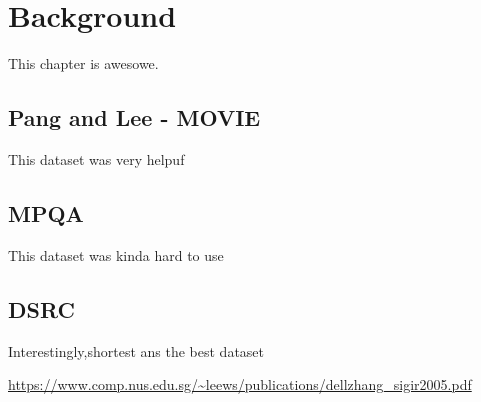 \chapter{Background}

This chapter is awesowe. \cite{remus2015}

\section{ Pang and Lee - MOVIE }

This dataset was very helpuf

\section{ MPQA }

This dataset was kinda hard to use

\section{ DSRC }

Interestingly,shortest ans the best dataset

\url{https://www.comp.nus.edu.sg/~leews/publications/dellzhang_sigir2005.pdf}
